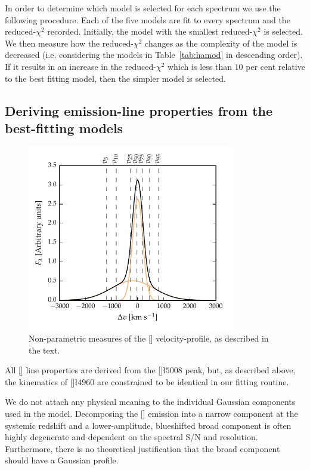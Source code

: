 In order to determine which model is selected for each spectrum we use the following procedure.  
Each of the five models are fit to every spectrum and the reduced-$\chi^2$ recorded.
Initially, the model with the smallest reduced-$\chi^2$ is selected. 
We then measure how the reduced-$\chi^2$ changes as the complexity of the model is decreased (i.e. considering the models in Table~\ref{tab:hamod} in descending order). 
If it results in an increase in the reduced-$\chi^2$ which is less than $10$ per cent relative to the best fitting model, then the simpler model is selected.  

\subsection{Deriving emission-line properties from the best-fitting models}

\begin{figure}[t!]
    \centering
    \includegraphics[width=0.8\textwidth]{figures/chapter04/example_oiii.pdf} 
    \caption[{Non-parametric measures of the [] velocity-profile.}]{Non-parametric measures of the [] velocity-profile, as described in the text.}     
    \label{fig:example_oiii}
\end{figure}

All [] line properties are derived from the []\l$5008$ peak, but, as described above, the kinematics of []\l$4960$ are constrained to be identical in our fitting routine. 

We do not attach any physical meaning to the individual Gaussian components used in the model. 
Decomposing the [] emission into a narrow component at the systemic redshift and a lower-amplitude, blueshifted broad component is often highly degenerate and dependent on the spectral S/N and resolution. 
Furthermore, there is no theoretical justification that the broad component should have a Gaussian profile.  

